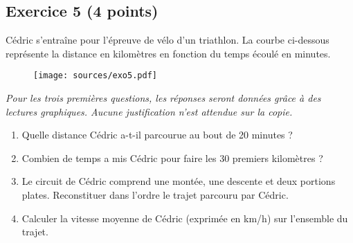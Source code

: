 \documentclass[12pt]{article}
\begin{document}
\subsection*{Exercice 5 (4 points)}

Cédric s’entraîne pour l’épreuve de vélo d’un triathlon. La courbe ci-dessous représente la distance en kilomètres en fonction du temps écoulé en minutes.

\begin{figure}[H]
  \centering
  \texttt{[image: sources/exo5.pdf]}
\end{figure}

\textit{Pour les trois premières questions, les réponses seront données grâce à des lectures graphiques. Aucune justification n’est attendue sur la copie.}

\begin{enumerate}
\item Quelle distance Cédric a-t-il parcourue au bout de 20 minutes ?
\item Combien de temps a mis Cédric pour faire les 30 premiers kilomètres ?
\item Le circuit de Cédric comprend une montée, une descente et deux portions plates. Reconstituer dans l’ordre le trajet parcouru par Cédric.
\item Calculer la vitesse moyenne de Cédric (exprimée en km/h) sur l'ensemble du trajet.
\end{enumerate}
\end{document}
